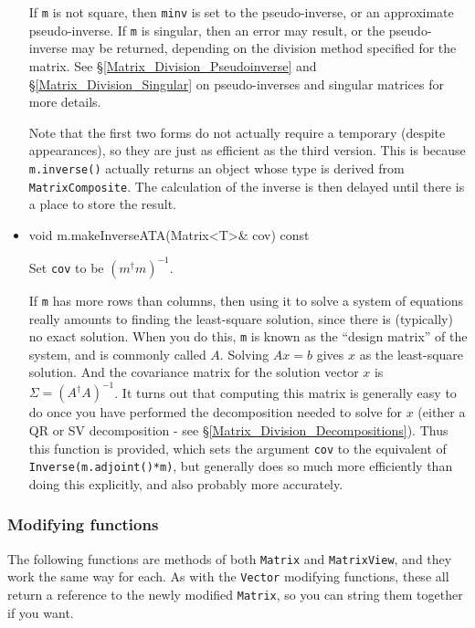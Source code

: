 \documentclass[twoside,letterpaper,11pt]{article}
\renewcommand{\tt}[1]{{\lstinline {#1}}}
\begin{document}
\begin{itemize}
If \tt{m} is not square, then \tt{minv} is set to the pseudo-inverse, or an approximate
pseudo-inverse.  If \tt{m} is singular, then an error may result, or the pseudo-inverse
may be returned, depending on the division method specified for the matrix.  
See \S\ref{Matrix_Division_Pseudoinverse} and \S\ref{Matrix_Division_Singular} 
on pseudo-inverses and singular matrices for more details.

Note that the first two forms do not actually require a 
temporary (despite appearances), so they are just as efficient as the third version.
This is because \tt{m.inverse()} actually returns an object whose type is derived from
\tt{MatrixComposite}.  The calculation of the inverse is then delayed 
until there is a place to store the result.

\item
\begin{tmvcode}
void m.makeInverseATA(Matrix<T>& cov) const
\end{tmvcode}
Set \tt{cov} to be $(m^\dagger m)^{-1}$.

If \tt{m} has more rows than columns, then using it to solve a system of equations
really amounts to finding the least-square solution, since there is (typically) no
exact solution.  When you do this, \tt{m} is known as the ``design matrix'' of the system,
and is commonly called $A$.  Solving $A x=b$ gives $x$ as the least-square 
solution.  And the covariance matrix for the solution vector $x$ is 
$\Sigma = (A^\dagger A)^{-1}$.
It turns out that computing this matrix is generally easy to do once you have 
performed the decomposition needed to solve for $x$ (either a QR or SV 
decomposition - see \S\ref{Matrix_Division_Decompositions}).  
Thus this function is provided, which sets the
argument \tt{cov} to the equivalent of \tt{Inverse(m.adjoint()*m)}, 
but generally does so much more efficiently than doing this explicitly, 
and also probably more accurately.

\end{itemize}

\subsubsection{Modifying functions}

The following functions are methods of both \tt{Matrix} and \tt{MatrixView},
and they work the same way for each.
As with the \tt{Vector} modifying functions, these all return a reference
to the newly modified \tt{Matrix}, so you can string them together if you want.
\end{document}
